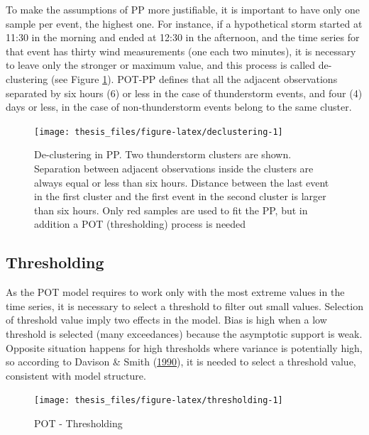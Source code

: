 \documentclass[12pt,oneside]{reedthesis}
\begin{document}
To make the assumptions of PP more justifiable, it is important to have only one sample per event, the highest one. For instance, if a hypothetical storm started at 11:30 in the morning and ended at 12:30 in the afternoon, and the time series for that event has thirty wind measurements (one each two minutes), it is necessary to leave only the stronger or maximum value, and this process is called de-clustering (see Figure \ref{fig:declustering}). POT-PP defines that all the adjacent observations separated by six hours (6) or less in the case of thunderstorm events, and four (4) days or less, in the case of non-thunderstorm events belong to the same cluster.

\footnotesize
\begin{figure}

{\centering \texttt{[image: thesis\_files/figure-latex/declustering-1]} 

}

\caption{De-clustering in PP. Two thunderstorm clusters are shown. Separation between adjacent observations inside the clusters are always equal or less than six hours. Distance between the last event in the first cluster and the first event in the second cluster is larger than six hours. Only red samples are used to fit the PP, but in addition a POT (thresholding) process is needed}\label{fig:declustering}
\end{figure}
\normalsize

\hypertarget{thresholding}{%
\subsection{Thresholding}\label{thresholding}}

As the POT model requires to work only with the most extreme values in the time series, it is necessary to select a threshold to filter out small values. Selection of threshold value imply two effects in the model. Bias is high when a low threshold is selected (many exceedances) because the asymptotic support is weak. Opposite situation happens for high thresholds where variance is potentially high, so according to Davison \& Smith (\protect\hyperlink{ref-Davison1990}{1990}), it is needed to select a threshold value, consistent with model structure.

\footnotesize
\begin{figure}

{\centering \texttt{[image: thesis\_files/figure-latex/thresholding-1]} 

}

\caption{POT - Thresholding}\label{fig:thresholding}
\end{figure}
\normalsize
\end{document}
